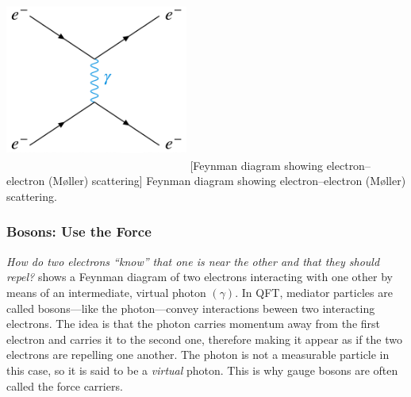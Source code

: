 \begin{multiFigure}
    \centering
        \includegraphics[width=6cm,height=6cm,keepaspectratio]{figures/sm/ee_scattering_moeller.png}
        [Feynman diagram showing electron--electron (Møller) scattering]
        {Feynman diagram showing electron--electron (Møller) scattering.} 
    \label{fig:ee_scattering}
\end{multiFigure}

\subsubsection{Bosons: Use the Force}

\emph{How do two electrons ``know'' that one is near the other and that they should repel?}
 shows a Feynman diagram of two electrons interacting with one other by means of an intermediate, virtual photon $(\gamma)$.
In QFT, mediator particles are called bosons---like the photon---convey interactions beween two interacting electrons.
The idea is that the photon carries momentum away from the first electron and carries it to the second one, therefore making it appear as if the two electrons are repelling one another.
The photon is not a measurable particle in this case, so it is said to be a \emph{virtual} photon.
This is why gauge bosons are often called the force carriers.

